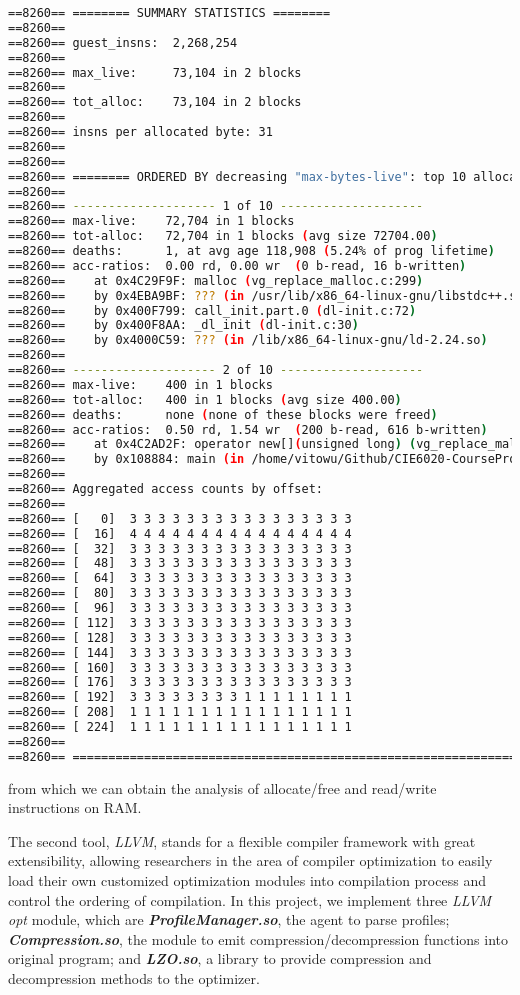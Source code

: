 \documentclass[]{article}
\begin{document}
\begin{lstlisting}[language=bash, caption=(Sample Profile)]
==8260== ======== SUMMARY STATISTICS ========
==8260== 
==8260== guest_insns:  2,268,254
==8260== 
==8260== max_live:     73,104 in 2 blocks
==8260== 
==8260== tot_alloc:    73,104 in 2 blocks
==8260== 
==8260== insns per allocated byte: 31
==8260== 
==8260== 
==8260== ======== ORDERED BY decreasing "max-bytes-live": top 10 allocators ========
==8260== 
==8260== -------------------- 1 of 10 --------------------
==8260== max-live:    72,704 in 1 blocks
==8260== tot-alloc:   72,704 in 1 blocks (avg size 72704.00)
==8260== deaths:      1, at avg age 118,908 (5.24% of prog lifetime)
==8260== acc-ratios:  0.00 rd, 0.00 wr  (0 b-read, 16 b-written)
==8260==    at 0x4C29F9F: malloc (vg_replace_malloc.c:299)
==8260==    by 0x4EBA9BF: ??? (in /usr/lib/x86_64-linux-gnu/libstdc++.so.6.0.22)
==8260==    by 0x400F799: call_init.part.0 (dl-init.c:72)
==8260==    by 0x400F8AA: _dl_init (dl-init.c:30)
==8260==    by 0x4000C59: ??? (in /lib/x86_64-linux-gnu/ld-2.24.so)
==8260== 
==8260== -------------------- 2 of 10 --------------------
==8260== max-live:    400 in 1 blocks
==8260== tot-alloc:   400 in 1 blocks (avg size 400.00)
==8260== deaths:      none (none of these blocks were freed)
==8260== acc-ratios:  0.50 rd, 1.54 wr  (200 b-read, 616 b-written)
==8260==    at 0x4C2AD2F: operator new[](unsigned long) (vg_replace_malloc.c:423)
==8260==    by 0x108884: main (in /home/vitowu/Github/CIE6020-CourseProj/test/valgrind_dhat/sample2/prog)
==8260== 
==8260== Aggregated access counts by offset:
==8260== 
==8260== [   0]  3 3 3 3 3 3 3 3 3 3 3 3 3 3 3 3 
==8260== [  16]  4 4 4 4 4 4 4 4 4 4 4 4 4 4 4 4 
==8260== [  32]  3 3 3 3 3 3 3 3 3 3 3 3 3 3 3 3 
==8260== [  48]  3 3 3 3 3 3 3 3 3 3 3 3 3 3 3 3 
==8260== [  64]  3 3 3 3 3 3 3 3 3 3 3 3 3 3 3 3 
==8260== [  80]  3 3 3 3 3 3 3 3 3 3 3 3 3 3 3 3 
==8260== [  96]  3 3 3 3 3 3 3 3 3 3 3 3 3 3 3 3 
==8260== [ 112]  3 3 3 3 3 3 3 3 3 3 3 3 3 3 3 3 
==8260== [ 128]  3 3 3 3 3 3 3 3 3 3 3 3 3 3 3 3 
==8260== [ 144]  3 3 3 3 3 3 3 3 3 3 3 3 3 3 3 3 
==8260== [ 160]  3 3 3 3 3 3 3 3 3 3 3 3 3 3 3 3 
==8260== [ 176]  3 3 3 3 3 3 3 3 3 3 3 3 3 3 3 3 
==8260== [ 192]  3 3 3 3 3 3 3 3 1 1 1 1 1 1 1 1 
==8260== [ 208]  1 1 1 1 1 1 1 1 1 1 1 1 1 1 1 1 
==8260== [ 224]  1 1 1 1 1 1 1 1 1 1 1 1 1 1 1 1 
==8260== 
==8260== ==============================================================

	\end{lstlisting}
	from which we can obtain the analysis of allocate/free and read/write instructions on RAM. \par 
	The second tool, \textit{LLVM}, stands for a flexible compiler framework with great extensibility, allowing researchers in the area of compiler optimization to easily load their own customized optimization modules into compilation process and control the ordering of compilation. In  this project, we implement three \textit{LLVM opt} module, which are \textbf{\textit{ProfileManager.so}}, the agent to parse profiles; \textbf{\textit{Compression.so}}, the module to emit compression/decompression functions into original program; and \textbf{\textit{LZO.so}}, a library to provide compression and decompression methods to the optimizer. \par 
\end{document}
